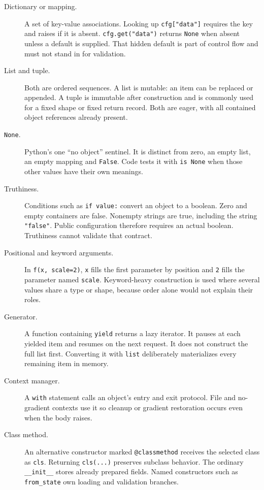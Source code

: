 \documentclass[10pt,aps,prd,twocolumn,nofootinbib]{revtex4-2}
\newcommand{\code}[1]{\texttt{#1}}
\begin{document}
\begin{description}
  \item[Dictionary or mapping.] A set of key-value associations.  Looking up
  \code{cfg["data"]} requires the key and raises if it is absent.
  \code{cfg.get("data")} returns \code{None} when absent unless a default is
  supplied.  That hidden default is part of control flow and must not stand in
  for validation.

  \item[List and tuple.] Both are ordered sequences.  A list is mutable: an
  item can be replaced or appended.  A tuple is immutable after construction
  and is commonly used for a fixed shape or fixed return record.  Both are
  eager, with all contained object references already present.

  \item[\code{None}.] Python's one ``no object'' sentinel.  It is distinct from
  zero, an empty list, an empty mapping and \code{False}.  Code tests it with
  \code{is None} when those other values have their own meanings.

  \item[Truthiness.] Conditions such as \code{if value:} convert an object to
  a boolean.  Zero and empty containers are false.  Nonempty strings are true,
  including the string \code{"false"}.  Public configuration therefore
  requires an actual boolean.  Truthiness cannot validate that contract.

  \item[Positional and keyword arguments.] In \code{f(x, scale=2)}, \code{x}
  fills the first parameter by position and \code{2} fills the parameter
  named \code{scale}.  Keyword-heavy construction is used where several
  values share a type or shape, because order alone would not explain their
  roles.

  \item[Generator.] A function containing \code{yield} returns a lazy
  iterator.  It pauses at each yielded item and resumes on the next request.
  It does not construct the full list first.  Converting it with \code{list}
  deliberately materializes every remaining item in memory.

  \item[Context manager.] A \code{with} statement calls an object's entry and
  exit protocol.  File and no-gradient contexts use it so cleanup or gradient
  restoration occurs even when the body raises.

  \item[Class method.] An alternative constructor marked
  \code{@classmethod} receives the selected class as \code{cls}.  Returning
  \code{cls(...)} preserves subclass behavior.  The ordinary
  \code{\_\_init\_\_} stores already prepared fields.  Named constructors such
  as \code{from\_state} own loading and validation branches.


\end{description}
\end{document}
